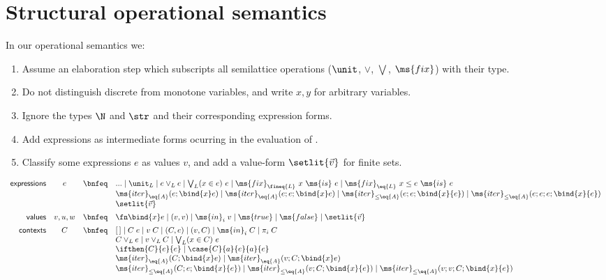 \documentclass{article}
\newcommand{\hole}{[\,]}
\newcommand{\tforin}[2]{\bigvee_{#1}(#2)\ }
\newcommand{\tfix}[2]{\ms{fix}_{#1}~{#2}~\ms{is}~}
\newcommand{\tfixle}[3]{\tfix{#1}{#2 \le #3}}
\newcommand{\iter}[4]{\ms{iter}_{#1}({#2}; \bind{#3}#4)}
\newcommand{\iterstep}[5]{\ms{iter}_{#1}({#2}; {#3}; {\bind{#4}#5})}
\newcommand{\iterle}[5]{\ms{iter}_{{\le}#1}({#2}; {#3}; \bind{#4}{#5})}
\newcommand{\iterlestep}[6]{\ms{iter}_{{\le}#1}({#2}; {#3}; {#4}; \bind{#5}{#6})}
\begin{document}
\section{Structural operational semantics}

In our operational semantics we:
\begin{enumerate}
\item Assume an elaboration step which subscripts all semilattice operations
($\unit$, $\vee$, $\bigvee$, $\ms{fix}$) with their type.
\item Do not distinguish discrete from monotone variables, and write $x,y$ for
  arbitrary variables.
\item Ignore the types $\N$ and $\str$ and their corresponding expression forms.
\item Add 
expressions as intermediate forms ocurring in the evaluation of .
\item Classify some expressions $e$ as values $v$, and add a value-form
  $\setlit{\vec{v}}$ for finite sets.
\end{enumerate}

\[\begin{array}{rccl}
  \textsf{expressions} & e
  &\bnfeq& ... \pipe \unit_L \pipe e \vee_L e \pipe \tforin{L}{x \in e} e
  \pipe \tfix{\fineq{L}}{x}{e} \pipe \tfixle{\eq{L}}{x}{e}{e}\\
  &&& \iter{\eq{A}}{e}{x}{e} \pipe \iterstep{\eq{A}}{e}{e}{x}{e}
  \pipe \iterle{\eq{A}}{e}{e}{x}{e} \pipe \iterlestep{\eq{A}}{e}{e}{e}{x}{e}\\
  &&& \setlit{\vec{v}}
  \vspace{0.5em}\\
  \textsf{values} & v,u,w
  &\bnfeq& \fn\bind{x} e \pipe (v, v) \pipe \ms{in}_i\; v
  \pipe \ms{true} \pipe \ms{false} \pipe \setlit{\vec{v}}
  \vspace{0.5em}\\
  \textsf{contexts} & C
  &\bnfeq& \hole \pipe C\;e \pipe v\;C \pipe (C, e) \pipe (v, C) \pipe \ms{in}_i\;C
  \pipe \pi_i \; C\\
  &&& C \vee_L e \pipe v \vee_L C \pipe \tforin{L}{x \in C} e\\
  &&& \ifthen{C}{e}{e} \pipe \case{C}{a}{e}{a}{e}\\
  &&& \iter{\eq{A}}{C}{x}{e} \pipe \iterstep{\eq{A}}{v}{C}{x}{e}\\
  &&& \iterle{\eq{A}}{C}{e}{x}{e} \pipe \iterle{\eq{A}}{v}{C}{x}{e}
  \pipe \iterlestep{\eq{A}}{v}{v}{C}{x}{e}
\end{array}\]
\end{document}
